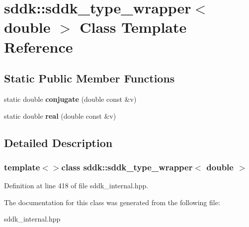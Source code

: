 \hypertarget{classsddk_1_1sddk__type__wrapper_3_01double_01_4}{}\section{sddk\+:\+:sddk\+\_\+type\+\_\+wrapper$<$ double $>$ Class Template Reference}
\label{classsddk_1_1sddk__type__wrapper_3_01double_01_4}
\subsection*{Static Public Member Functions}
\begin{DoxyCompactItemize}
\item 
\hypertarget{classsddk_1_1sddk__type__wrapper_3_01double_01_4_aed62ac2708e4284286281fff75587046}{}static double {\bfseries conjugate} (double const \&v)\label{classsddk_1_1sddk__type__wrapper_3_01double_01_4_aed62ac2708e4284286281fff75587046}

\item 
\hypertarget{classsddk_1_1sddk__type__wrapper_3_01double_01_4_ac27b1dd92b7cc3049c863a765286b318}{}static double {\bfseries real} (double const \&v)\label{classsddk_1_1sddk__type__wrapper_3_01double_01_4_ac27b1dd92b7cc3049c863a765286b318}

\end{DoxyCompactItemize}


\subsection{Detailed Description}
\subsubsection*{template$<$$>$class sddk\+::sddk\+\_\+type\+\_\+wrapper$<$ double $>$}



Definition at line 418 of file sddk\+\_\+internal.\+hpp.



The documentation for this class was generated from the following file\+:\begin{DoxyCompactItemize}
\item 
sddk\+\_\+internal.\+hpp\end{DoxyCompactItemize}
